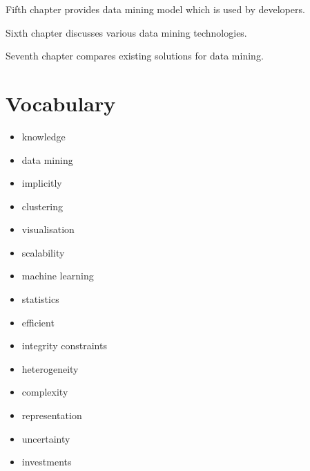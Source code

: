 \documentclass[a4paper,12pt,notitlepage,pdftex]{scrreprt}
\begin{document}
    Fifth chapter provides data mining model which is used by developers.

    Sixth chapter discusses various data mining technologies.

    Seventh chapter compares existing solutions for data mining.
\chapter{Vocabulary}
    \begin{multicols}{2}
        \begin{itemize}
            \item knowledge
            \item data mining
            \item implicitly
            \item clustering
            \item visualisation
            \item scalability
            \item machine learning
            \item statistics
            \item efficient
            \item integrity constraints
            \item heterogeneity
            \item complexity
            \item representation
            \item uncertainty
            \item investments
        \end{itemize}
    \end{multicols}
\end{document}
